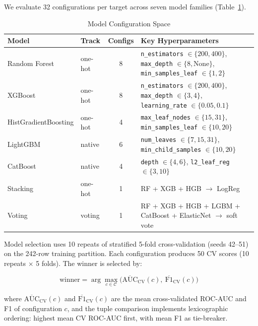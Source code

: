 \documentclass[conference]{IEEEtran}
\begin{document}
We evaluate 32 configurations per target across seven model families (Table~\ref{tab:configs}).

\begin{table}[!t]
\centering
\caption{Model Configuration Space}
\label{tab:configs}
\small
\begin{tabular}{llcp{}}
\toprule
\textbf{Model} & \textbf{Track} & \textbf{Configs} & \textbf{Key Hyperparameters} \\
\midrule
Random Forest & one-hot & 8 & \texttt{n\_estimators} $\in \{200, 400\}$, \texttt{max\_depth} $\in \{8, \text{None}\}$, \texttt{min\_samples\_leaf} $\in \{1, 2\}$ \\
XGBoost & one-hot & 8 & \texttt{n\_estimators} $\in \{200, 400\}$, \texttt{max\_depth} $\in \{3, 4\}$, \texttt{learning\_rate} $\in \{0.05, 0.1\}$ \\
HistGradientBoosting & one-hot & 4 & \texttt{max\_leaf\_nodes} $\in \{15, 31\}$, \texttt{min\_samples\_leaf} $\in \{10, 20\}$ \\
LightGBM & native & 6 & \texttt{num\_leaves} $\in \{7, 15, 31\}$, \texttt{min\_child\_samples} $\in \{10, 20\}$ \\
CatBoost & native & 4 & \texttt{depth} $\in \{4, 6\}$, \texttt{l2\_leaf\_reg} $\in \{3, 10\}$ \\
Stacking & one-hot & 1 & RF + XGB + HGB $\rightarrow$ LogReg \\
Voting & voting & 1 & RF + XGB + HGB + LGBM + CatBoost + ElasticNet $\rightarrow$ soft vote \\
\bottomrule
\end{tabular}
\end{table}

Model selection uses 10 repeats of stratified 5-fold cross-validation (seeds 42--51) on the 242-row training partition. Each configuration produces 50 CV scores (10 repeats $\times$ 5 folds). The winner is selected by:

\begin{equation}
\text{winner} = \arg\max_{c \in \mathcal{C}} \Big( \overline{\text{AUC}}_{\text{CV}}(c),\ \overline{\text{F1}}_{\text{CV}}(c) \Big)
\end{equation}

where $\overline{\text{AUC}}_{\text{CV}}(c)$ and $\overline{\text{F1}}_{\text{CV}}(c)$ are the mean cross-validated ROC-AUC and F1 of configuration $c$, and the tuple comparison implements lexicographic ordering: highest mean CV ROC-AUC first, with mean F1 as tie-breaker.
\end{document}
